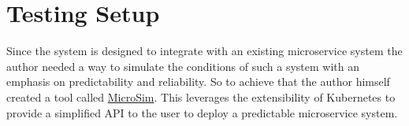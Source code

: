 \section{Testing Setup}

Since the system is designed to integrate with an existing microservice system the author needed a way to simulate the conditions of such a system with an emphasis on predictability and reliability. So to achieve that the author himself created a tool called \href{https://github.com/MrSupiri/MicroSim}{MicroSim}. This leverages the extensibility of Kubernetes to provide a simplified API to the user to deploy a predictable microservice system.

